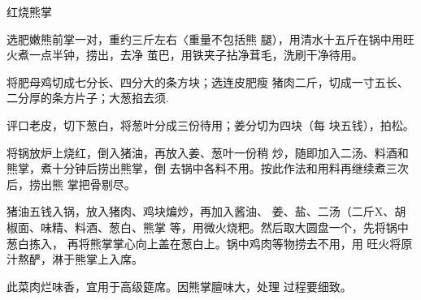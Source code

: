 \begin{recipe}{红烧熊掌}

\ingredients


\cooking

\step 选肥嫩熊前掌一对，重约三斤左右〈重量不包括熊 腿），用清水十五斤在锅中用旺火煮一点半钟，捞出，去净 茧巴，用铁夹子拈净茸毛，洗刷干净待用。

\step 将肥母鸡切成七分长、四分大的条方块；选连皮肥瘦 猪肉二斤，切成一寸五长、二分厚的条方片子；大葱掐去须.

评口老皮，切下葱白，将葱叶分成三份待用；姜分切为四块（每 块五钱），拍松。

\step 将锅放炉上烧红，倒入猪油，再放入姜、葱叶一份稍 炒，随即加入二汤、料酒和熊掌，煮十分钟后捞出熊掌，倒 去锅中各料不用。按此作法和用料再继续煮三次后，捞出熊 掌把骨剔尽。

\step 猪油五钱入锅，放入猪肉、鸡块煸炒，再加入酱油、 姜、盐、二汤（二斤X、胡椒面、味精、料酒、葱白、熊掌 等，用微火烧粑。然后取大圆盘一个，先将锅中葱白拣入， 再将熊掌掌心向上盖在葱白上。锅中鸡肉等物捞去不用，用 旺火将原汁熬酽，淋于熊掌上入席。

\notes

此菜肉烂味香，宜用于高级筵席。因熊掌膻味大，处理 过程要细致。

\end{recipe}

